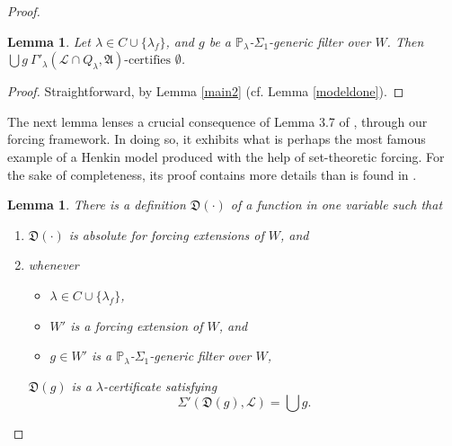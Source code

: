 \documentclass[12pt, twoside]{memoir}
\numberwithin{equation}{section}
\newtheorem{lem}[thm]{Lemma}
\theoremstyle{definition}
\theoremstyle{remark}
\theoremstyle{definition}
\theoremstyle{definition}
\theoremstyle{definition}
\theoremstyle{remark}
\begin{document}
\begin{proof}
\begin{lem}\label{modeldone2}
Let $\lambda \in C \cup \{\lambda_f\}$, and $g$ be a $\mathbb{P}_{\lambda}$-$\Sigma_1$-generic filter over $W$. Then $\bigcup g \ \Gamma'_{\lambda} (\mathcal{L} \cap Q_{\lambda}, \mathfrak{A}) \text{-certifies } \emptyset$.
\end{lem}

\begin{proof}
Straightforward, by Lemma \ref{main2} (cf. Lemma \ref{modeldone}).
\end{proof}

The next lemma lenses a crucial consequence of Lemma 3.7 of \cite{schindler}, through our forcing framework. In doing so, it exhibits what is perhaps the most famous example of a Henkin model produced with the help of set-theoretic forcing. For the sake of completeness, its proof contains more details than is found in \cite{schindler}.

\begin{lem}\label{lem446}
There is a definition $\mathfrak{D}(\cdot)$ of a function in one variable such that
\begin{enumerate}[label=(\arabic*)]
    \item\label{4461} $\mathfrak{D}(\cdot)$ is absolute for forcing extensions of $W$, and
    \item\label{4462} whenever
    \begin{itemize}
        \item $\lambda \in C \cup \{\lambda_f\}$, 
        \item $W'$ is a forcing extension of $W$, and
        \item $g \in W'$ is a $\mathbb{P}_{\lambda}$-$\Sigma_1$-generic filter over $W$,
    \end{itemize}
    $\mathfrak{D}(g)$ is a $\lambda$-certificate satisfying 
    \begin{equation*}
        \Sigma'(\mathfrak{D}(g), \mathcal{L}) = \bigcup g \text{.}
    \end{equation*} 
\end{enumerate} 
\end{lem}


\end{proof}
\end{document}
